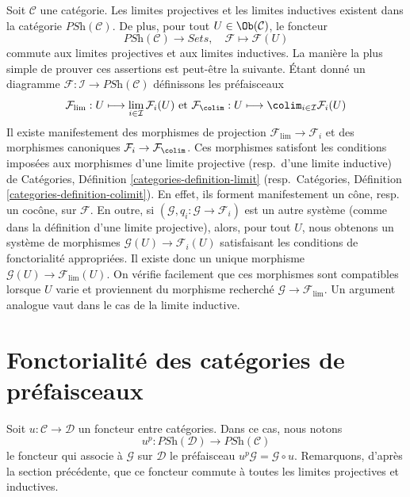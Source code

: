 \noindent
Soit $\mathcal{C}$ une catégorie.
Les limites projectives et les limites inductives existent dans la catégorie
$\textit{PSh}(\mathcal{C})$. De plus, pour tout
$U \in \Ob(\mathcal{C})$, le foncteur
$$
\textit{PSh}(\mathcal{C})
\longrightarrow
\textit{Sets}, \quad
\mathcal{F}
\longmapsto
\mathcal{F}(U)
$$
commute aux limites projectives et aux limites inductives. La manière la plus simple
de prouver ces assertions est peut-être la suivante. Étant donné un diagramme
$
\mathcal{F} :
\mathcal{I}
\to
\textit{PSh}(\mathcal{C})
$
définissons les préfaisceaux
$$
\mathcal{F}_{\lim} :
U
\longmapsto
\lim_{i \in \mathcal{I}} \mathcal{F}_i(U)
\text{  et  }
\mathcal{F}_{\colim} :
U
\longmapsto
\colim_{i \in \mathcal{I}} \mathcal{F}_i(U)
$$
Il existe manifestement des morphismes de projection $\mathcal{F}_{\lim} \to \mathcal{F}_i$
et des morphismes canoniques $\mathcal{F}_i \to \mathcal{F}_{\colim}$. Ces
morphismes satisfont les conditions imposées aux morphismes d’une limite projective
(resp.\ d’une limite inductive) de Catégories, Définition \ref{categories-definition-limit}
(resp.\ Catégories, Définition \ref{categories-definition-colimit}).
En effet, ils forment manifestement un cône, resp. un cocône, sur $\mathcal{F}$.
En outre, si $(\mathcal{G}, q_i : \mathcal{G} \to \mathcal{F}_i)$
est un autre
système (comme dans la définition d’une limite projective), alors, pour tout
$U$, nous obtenons un système de morphismes $\mathcal{G}(U) \to \mathcal{F}_i(U)$
satisfaisant les conditions de fonctorialité appropriées. Il existe donc un unique
morphisme $\mathcal{G}(U) \to \mathcal{F}_{\lim}(U)$. On vérifie facilement
que ces morphismes sont compatibles lorsque $U$ varie et proviennent du
morphisme recherché $\mathcal{G} \to \mathcal{F}_{\lim}$.
Un argument analogue vaut dans le cas de la limite inductive.





















\section{Fonctorialité des catégories de préfaisceaux}
\label{section-functoriality-PSh}

\noindent
Soit $u : \mathcal{C} \to \mathcal{D}$ un foncteur entre catégories.
Dans ce cas, nous notons
$$
u^p :
\textit{PSh}(\mathcal{D})
\longrightarrow
\textit{PSh}(\mathcal{C})
$$
le foncteur qui associe à $\mathcal{G}$ sur $\mathcal{D}$ le préfaisceau
$u^p\mathcal{G} = \mathcal{G} \circ u$. Remarquons, d’après la section précédente,
que ce foncteur commute à toutes les limites projectives et inductives.

